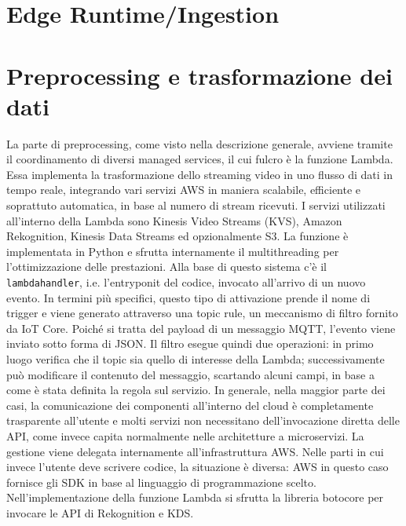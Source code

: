 \section{Edge Runtime/Ingestion}
\section{Preprocessing e trasformazione dei dati}
La parte di preprocessing, come visto nella descrizione generale, avviene tramite il coordinamento di diversi managed services, il cui fulcro è la funzione Lambda. Essa implementa la trasformazione dello streaming video in uno flusso di dati in tempo reale, integrando vari servizi AWS in maniera scalabile, efficiente e soprattuto automatica, in base al numero di stream ricevuti. I servizi utilizzati all'interno della Lambda sono Kinesis Video Streams (KVS), Amazon Rekognition, Kinesis Data Streams ed opzionalmente S3. La funzione è implementata in Python e sfrutta internamente il multithreading per l'ottimizzazione delle prestazioni. Alla base di questo sistema c'è il \texttt{lambda\textunderscore handler}, i.e. l'entryponit del codice, invocato all’arrivo di un nuovo evento. In termini più specifici, questo tipo di attivazione prende il nome di trigger e viene generato attraverso una topic rule, un meccanismo di filtro fornito da IoT Core. Poiché si tratta del payload di un messaggio MQTT, l'evento viene inviato sotto forma di JSON. Il filtro esegue quindi due operazioni: in primo luogo verifica che il topic sia quello di interesse della Lambda; successivamente può modificare il contenuto del messaggio, scartando alcuni campi, in base a come è stata definita la regola sul servizio. In generale, nella maggior parte dei casi, la comunicazione dei componenti all'interno del cloud è completamente trasparente all'utente e molti servizi non necessitano dell'invocazione diretta delle API, come invece capita normalmente nelle architetture a microservizi. La gestione viene delegata internamente all'infrastruttura AWS. Nelle parti in cui invece l'utente deve scrivere codice, la situazione è diversa: AWS in questo caso fornisce gli SDK in base al linguaggio di programmazione scelto. Nell'implementazione della funzione Lambda si sfrutta la libreria botocore per invocare le API di Rekognition e KDS.

